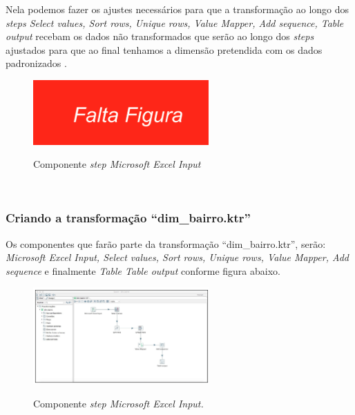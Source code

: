 Nela podemos fazer os ajustes necess\'{a}rios para que a transforma\c{c}\~{a}o ao longo dos \textit{steps Select values, Sort rows, Unique rows, Value Mapper, Add sequence, Table output} recebam os dados n\~{a}o transformados que ser\~{a}o ao longo dos \textit{steps} ajustados para que ao final tenhamos a dimens\~{a}o pretendida com os dados padronizados .

\begin{figure}[H]
	\vspace*{0,2cm}
    \centering
    \caption{Componente \textit{step Microsoft Excel Input}}
    \includegraphics[width=0.6\textwidth]{./04-figuras/falta-figura.png}
    \label{fig:ilustfigfaltafigura03}
\end{figure}
\vspace*{-0,9cm}
{\raggedright {}} \\


\subsubsection{Criando a transforma\c{c}\~{a}o ``dim\_bairro.ktr''}

Os componentes que far\~{a}o parte da transforma\c{c}\~{a}o ``dim\_bairro.ktr'', ser\~{a}o: \textit{Microsoft Excel Input, Select values, Sort rows, Unique rows, Value Mapper, Add sequence} e finalmente \textit{Table Table output} conforme figura abaixo.

\begin{figure}[H]
	\vspace*{0,2cm}
    \centering
    \caption{Componente \textit{step Microsoft Excel Input.}}
    \includegraphics[width=0.6\textwidth]{./04-figuras/figura-dim-bairro}
    \label{fig:ilustfigdimbairro}
\end{figure}
\vspace*{-0,9cm}
{\raggedright {}} \\

